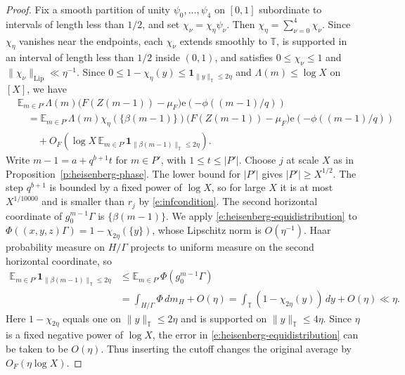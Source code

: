 \documentclass[12pt]{amsart}
\newcommand{\1}{\mathbf 1}
\newcommand{\e}{\mathrm e}
\theoremstyle{definition}
\begin{document}
\begin{proof}
Fix a smooth partition of unity $\psi_0,\ldots,\psi_4$ on $[0,1]$
subordinate to intervals of length less than $1/2$, and set
$\chi_\nu=\chi_\eta\psi_\nu$. Then
$\chi_\eta=\sum_{\nu=0}^4\chi_\nu$. Since $\chi_\eta$ vanishes
near the endpoints, each $\chi_\nu$ extends smoothly to
$\mathbb T$, is supported in an interval of length less than
$1/2$ inside $(0,1)$, and satisfies
$0\leq\chi_\nu\leq1$ and
$\|\chi_\nu\|_{\mathrm{Lip}}\ll\eta^{-1}$.
Since \(0\leq 1-\chi_\eta(y)\leq
\mathbf1_{\|y\|_{\mathbb T}\leq2\eta}\) and
\(\Lambda(m)\leq\log X\) on \([X]\), we have
\[
\begin{aligned}
 &\mathbb E_{m\in P'}\Lambda(m)
   \bigl(F(Z(m-1))-\mu_F\bigr)\e(-\phi((m-1)/q))\\
 &\quad=
 \mathbb E_{m\in P'}\Lambda(m)\chi_\eta(\{\beta(m-1)\})
   \bigl(F(Z(m-1))-\mu_F\bigr)\e(-\phi((m-1)/q))\\
 &\qquad+
 O_F\!\left(
 \log X\,\mathbb E_{m\in P'}
 \mathbf1_{\|\beta(m-1)\|_{\mathbb T}\leq2\eta}
 \right).
\end{aligned}
\]
Write \(m-1=a+q^{b+1}t\) for \(m\in P'\), with
\(1\leq t\leq |P'|\). Choose $j$ at scale $X$ as in
Proposition~\ref{p:heisenberg-phase}. The lower bound for $|P'|$
gives $|P'|\geq X^{1/2}$. The step $q^{b+1}$ is bounded by a
fixed power of $\log X$, so for large $X$ it is at most
$X^{1/10000}$ and is smaller than $r_j$ by
\eqref{e:infcondition}. The second horizontal coordinate of
\(g_0^{m-1}\Gamma\) is \(\{\beta(m-1)\}\). We apply
\eqref{e:heisenberg-equidistribution} to
\(\Phi((x,y,z)\Gamma)=1-\chi_{2\eta}(\{y\})\), whose Lipschitz
norm is \(O(\eta^{-1})\). Haar probability measure on
\(H/\Gamma\) projects to uniform measure on the second
horizontal coordinate, so
\[
\begin{aligned}
 \mathbb E_{m\in P'}
 \mathbf1_{\|\beta(m-1)\|_{\mathbb T}\leq2\eta}
 &\leq \mathbb E_{m\in P'}\Phi(g_0^{m-1}\Gamma)\\
 &=\int_{H/\Gamma}\Phi\,dm_H+O(\eta)
 =\int_{\mathbb T}(1-\chi_{2\eta}(y))\,dy+O(\eta)
 \ll\eta.
\end{aligned}
\]
Here \(1-\chi_{2\eta}\) equals one on
\(\|y\|_{\mathbb T}\leq2\eta\) and is supported on
\(\|y\|_{\mathbb T}\leq4\eta\). Since \(\eta\) is a fixed
negative power of \(\log X\), the error in
\eqref{e:heisenberg-equidistribution} can be taken to be
\(O(\eta)\). Thus inserting the cutoff changes the original
average by \(O_F(\eta\log X)\).


\end{proof}
\end{document}

